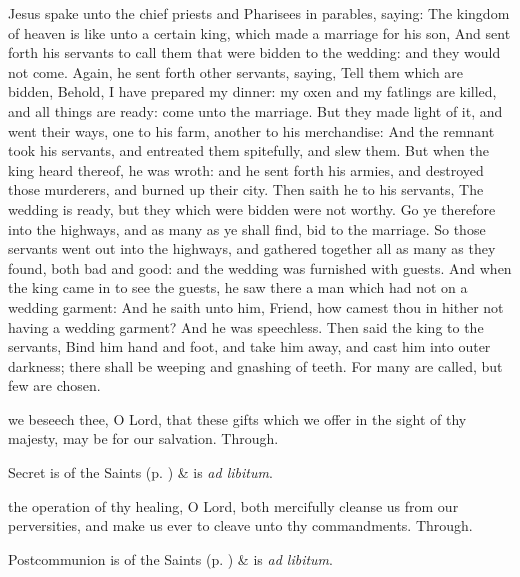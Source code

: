  Jesus spake unto the chief priests and Pharisees in parables, saying: The kingdom of heaven is like unto a certain king, which made a marriage for his son, And sent forth his servants to call them that were bidden to the wedding: and they would not come. Again, he sent forth other servants, saying, Tell them which are bidden, Behold, I have prepared my dinner: my oxen and my fatlings are killed, and all things are ready: come unto the marriage. But they made light of it, and went their ways, one to his farm, another to his merchandise: And the remnant took his servants, and entreated them spitefully, and slew them. But when the king heard thereof, he was wroth: and he sent forth his armies, and destroyed those murderers, and burned up their city. Then saith he to his servants, The wedding is ready, but they which were bidden were not worthy. Go ye therefore into the highways, and as many as ye shall find, bid to the marriage. So those servants went out into the highways, and gathered together all as many as they found, both bad and good: and the wedding was furnished with guests. And when the king came in to see the guests, he saw there a man which had not on a wedding garment: And he saith unto him, Friend, how camest thou in hither not having a wedding garment? And he was speechless. Then said the king to the servants, Bind him hand and foot, and take him away, and cast him into outer darkness; there shall be weeping and gnashing of teeth. For many are called, but few are chosen.

\secret
{} we beseech thee, O Lord, that these gifts which we offer in the sight of thy majesty, may be for our salvation. Through.
\begin{rubric}
     Secret is of the Saints (p. \pageref{SPSaints}) \&  is \emph{ad libitum}.
\end{rubric}

\postcommunion
{} the operation of thy healing, O Lord, both mercifully cleanse us from our perversities, and make us ever to cleave unto thy commandments. Through.
\begin{rubric}
     Postcommunion is of the Saints (p. \pageref{SPSaints}) \&  is \emph{ad libitum}.
\end{rubric}

